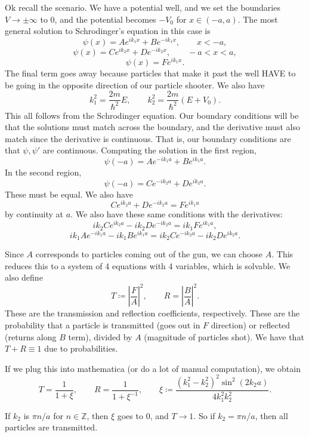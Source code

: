 Ok recall the scenario. We have a potential well, and we set the boundaries $V\to \pm \infty $ to $0$, and the potential becomes $-V_0$ for $x\in (-a,a)$. The most general solution to Schrodinger's equation in this case is
\[
	\psi (x)=Ae^{ik_1x} +Be^{-ik_1x} ,\qquad x<-a,
\]
\[
	\psi (x)=Ce^{ik_2x} +De^{-ik_2x} ,\qquad -a<x<a,
\]
\[
	\psi (x)=Fe^{ik_1x} 
.\]
The final term goes away because particles that make it past the well HAVE to be going in the opposite direction of our particle shooter. We also have
\[
	k_1^2=\frac{2m}{\hbar ^2} E,\qquad k_2^2=\frac{2m}{\hbar ^2} \left( E+V_0 \right) 
.\]
This all follows from the Schrodinger equation. Our boundary conditions will be that the solutions must match across the boundary, and the derivative must also match since the derivative is continuous. That is, our boundary conditions are that $\psi ,\psi '$ are continuous. Computing the solution in the first region,
\[
	\psi (-a)=Ae^{-ik_1a} +Be^{ik_1a} 
.\]
In the second region,
\[
	\psi (-a)=Ce^{-ik_2a} +De^{ik_2a} 
.\]
These must be equal. We also have
\[
	Ce^{ik_2a} +De^{-ik_2a} =Fe^{ik_1a} 
\]
by continuity at $a$. We also have these same conditions with the derivatives:
\[
	ik_2Ce^{ik_2a} -ik_2De^{-ik_2a} =ik_1Fe^{ik_1a} ,
\]
\[
	ik_1Ae^{-ik_1a} -ik_1Be^{ik_1a} =ik_2Ce^{-ik_2a} -ik_2De^{ik_2a} 
.\]

Since $A$ corresponds to particles coming out of the gun, we can choose $A$. This reduces this to a system of 4 equations with 4 variables, which is solvable. We also define
\[
	T\coloneqq \left| \frac{F}{A}  \right| ^2,\qquad R=\left| \frac{B}{A}  \right| ^2
.\]
These are the transmission and reflection coefficients, respectively. These are the probability that a particle is transmitted (goes out in $F$ direction) or reflected (returns along $B$ term), divided by $A$ (magnitude of particles shot). We have that $T+R \equiv 1$ due to probabilities.

If we plug this into mathematica (or do a lot of manual computation), we obtain
\[
	T=\frac{1}{1+\xi} ,\qquad R=\frac{1}{1+\xi^{-1}  } ,\qquad \xi \coloneqq \frac{\left( k_1^2-k_2^2 \right) ^2 \sin ^2(2k_2a)}{4k_1^2k_2^2} 
.\]

If $k_2$ is $\pi n/a$ for $n\in\mathbb{Z} $, then $\xi $ goes to $0$, and $T\to 1$. So if $k_2=\pi n/a$, then all particles are transmitted.

